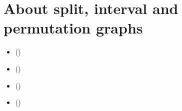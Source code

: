 \documentclass[a4paper,10pt,english]{sphinxhowto}
\begin{document}
\section{About split, interval and permutation graphs}
\label{\detokenize{tutorial:about-split-interval-and-permutation-graphs}}\label{\detokenize{tutorial:permutation-tutorial-label}}
\begin{sphinxShadowBox}
\begin{itemize}
\item {} 
\label{\detokenize{tutorial:id230}}{\hyperref[\detokenize{tutorial:a-multipally-perfect-graph}]{}} ()

\item {} 
\label{\detokenize{tutorial:id231}}{\hyperref[\detokenize{tutorial:who-is-the-lier}]{}} ()

\item {} 
\label{\detokenize{tutorial:id232}}{\hyperref[\detokenize{tutorial:generating-permutation-graphs}]{}} ()

\item {} 
\label{\detokenize{tutorial:id233}}{\hyperref[\detokenize{tutorial:recognizing-permutation-graphs}]{}} ()

\end{itemize}
\end{sphinxShadowBox}
\end{document}
